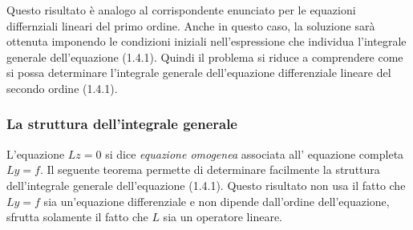\documentclass[a4paper]{article}
\numberwithin{equation}{subsection}
\begin{document}
\noindent
Questo risultato è analogo al corrispondente enunciato per le equazioni differnziali lineari del primo ordine.
Anche in questo caso, la soluzione sarà ottenuta imponendo le condizioni iniziali nell'espressione che individua l'integrale generale dell'equazione (1.4.1).
Quindi il problema si riduce a comprendere come si possa determinare l'integrale generale dell'equazione differenziale lineare del secondo ordine (1.4.1).

\subsubsection{La struttura dell'integrale generale}

L'equazione $Lz = 0$ si dice \textit{equazione omogenea} associata all'
equazione completa $Ly = f$. Il seguente teorema permette di determinare facilmente
la struttura dell'integrale generale dell'equazione (1.4.1). Questo risultato 
non usa il fatto che $Ly = f$ sia un'equazione differenziale e non dipende dall'ordine 
dell'equazione, sfrutta solamente il fatto che $L$ sia un operatore lineare.
\end{document}
